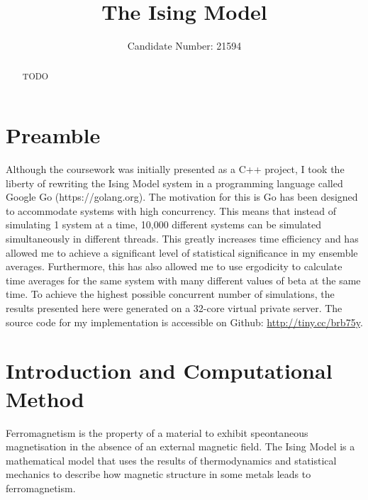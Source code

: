 \documentclass[11pt]{iopart}
\begin{document}
\section*{Preamble}
Although the coursework was initially presented as a C++ project, I took the liberty of rewriting the Ising Model system in a programming language called Google Go (https://golang.org). The motivation for this is Go has been designed to accommodate systems with high concurrency. This means that instead of simulating 1 system at a time, 10,000 different systems can be simulated simultaneously in different threads. This greatly increases time efficiency and has allowed me to achieve a significant level of statistical significance in my ensemble averages. Furthermore, this has also allowed me to use ergodicity to calculate time averages for the same system with many different values of beta at the same time. To achieve the highest possible concurrent number of simulations, the results presented here were generated on a 32-core virtual private server. The source code for my implementation is accessible on Github: \url{http://tiny.cc/brb75y}.\cleardoublepage

\setlength{\marginparwidth}{1.5cm}

\title[]{The Ising Model}

\author{Candidate Number: 21594}

\address{Department of Physics,
University of Bath, Bath BA2 7AY, United Kingdom}
\begin{abstract}
TODO
\end{abstract}



\section{Introduction and Computational Method}
Ferromagnetism is the property of a material to exhibit speontaneous magnetisation in the absence of an external magnetic field. The Ising Model is a mathematical model that uses the results of thermodynamics and statistical mechanics to describe how magnetic structure in some metals leads to ferromagnetism.
\end{document}
